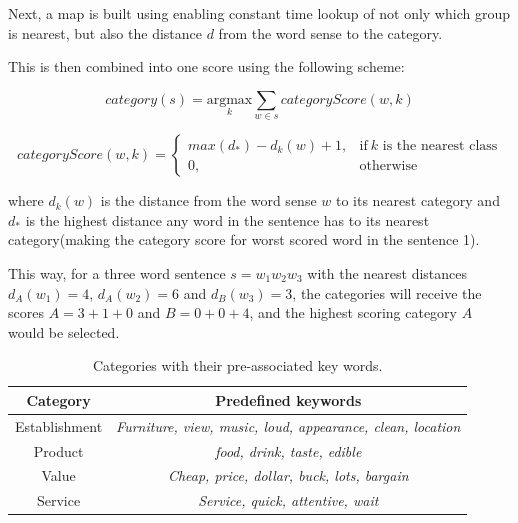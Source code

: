 \documentclass[a4paper,11pt]{kth-mag}
\begin{document}
Next, a map is built using enabling constant time lookup of not only which group is nearest,
but also the distance $d$ from the word sense to the category.

This is then combined into one score using the following scheme:

\begin{equation} \label{eq:heruistic}
  category(s) =
  \underset{k}{\text{argmax}}
  \sum_{w \in s} categoryScore(w, k)
\end{equation}

\begin{equation} \label{eq:heruistic_d}
  categoryScore(w, k) =
  \begin{cases}
    max(d_*) - d_k(w) + 1, & \text{if}\ k \text{ is the nearest class}\\
    0, & \text{otherwise}
  \end{cases}
\end{equation}

where $d_k(w)$ is the distance from the word sense $w$
to its nearest category and $d_*$ is the highest distance any word in the sentence
has to its nearest category(making the category score for worst scored word in the sentence 1).

This way, for a three word sentence $s=w_1w_2w_3$ with the nearest distances
$d_A(w_1)=4$, $d_A(w_2)=6$ and $d_B(w_3)=3$,
the categories will receive the scores $A=3+1+0$ and $B=0+0+4$, and the highest scoring category $A$
would be selected.

\begin{table}[b]
  \centering
  \begin{tabular}{| c | c |}
    \hline
    \textbf{Category} & \textbf{Predefined keywords}\\ \hline
    Establishment & \emph{Furniture, view, music, loud, appearance, clean, location}\\ \hline
    Product & \emph{food, drink, taste, edible}\\ \hline
    Value & \emph{Cheap, price, dollar, buck, lots, bargain}\\ \hline
    Service & \emph{Service, quick, attentive, wait}\\ \hline
  \end{tabular}
  \caption{Categories with their pre-associated key words.}
  \label{tab:cat_words}
\end{table}
\end{document}
